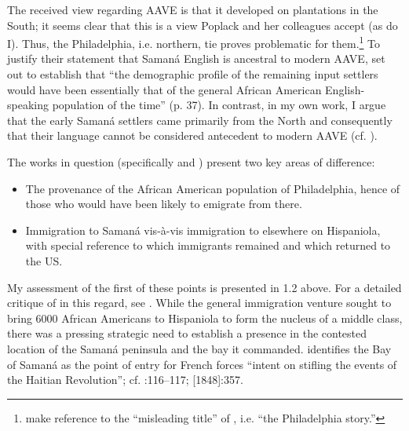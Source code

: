 \documentclass[output=paper,colorlinks,citecolor=brown]{langscibook}
\begin{document}
The received view regarding AAVE is that it developed on plantations in the South; it seems clear that this is a view Poplack and her colleagues accept (as do I). Thus, the Philadelphia, i.e. northern, tie proves problematic for them.\footnote{\citet[37]{PoplackTagliamonte2001} make reference to the “misleading title” of \citet{PoplackSankoff1987}, i.e. “the Philadelphia story.”} To justify their statement that Samaná English is ancestral to modern AAVE, \citet{PoplackTagliamonte2001} set out to establish that “the demographic profile of the remaining input settlers would have been essentially that of the general African American English-speaking population of the time” (p. 37). In contrast, in my own work, I argue that the early Samaná settlers came primarily from the North and consequently that their language cannot be considered antecedent to modern AAVE (cf. \citealt[341--342]{Hannah1997}).

The works in question (specifically \citealt{PoplackTagliamonte2001} and \citealt{Singler2007part2}) present two key areas of difference:

\begin{itemize}
\item The provenance of the African American population of Philadelphia, hence of those who would have been likely to emigrate from there.
 
\item Immigration to Samaná vis-à-vis immigration to elsewhere on Hispaniola, with special reference to which immigrants remained and which returned to the US.
\end{itemize}

My assessment of the first of these points is presented in 1.2 above. For a detailed critique of \citet{PoplackTagliamonte2001} in this regard, see \citet{Singler2007part2}. While the general immigration venture sought to bring 6000 African Americans to Hispaniola to form the nucleus of a middle class, there was a pressing strategic need to establish a presence in the contested location of the Samaná peninsula and the bay it commanded. \citet[224–225]{Mann-Hamilton2013} identifies the Bay of Samaná as the point of entry for French forces “intent on stifling the events of the Haitian Revolution”; cf. \citealt{Keim1870}:116–117; \citealt{Madiou1988} [1848]:357.
\end{document}
